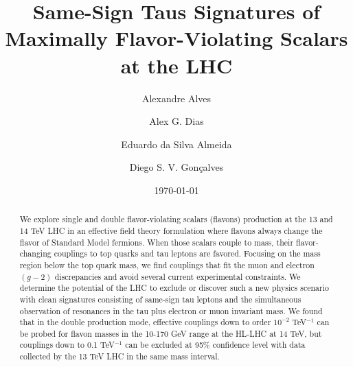 \documentclass[prd,amsfonts,onecolumn,superscriptaddress,aps,nofootinbib,11pt]{revtex4-1}
\begin{document}
	
\title{ %
Same-Sign Taus Signatures of Maximally Flavor-Violating Scalars at the LHC }

\author{Alexandre Alves}
\author{Alex G. Dias}
\author{Eduardo da Silva Almeida}
\author{Diego S. V. Gon\c{c}alves}

\date{\today}
	
\begin{abstract}
We explore single and double flavor-violating scalars (flavons) production at the 13 and 14 TeV LHC in an effective field theory formulation where flavons always change the flavor of Standard Model fermions. When those scalars couple to mass, their flavor-changing couplings to top quarks and tau leptons are favored. Focusing on the mass region below the top quark mass, we find couplings that fit the muon and electron $(g-2)$ discrepancies and avoid several current experimental constraints. We determine the potential of the LHC to exclude or discover such a new physics scenario with clean signatures consisting of same-sign tau leptons and the simultaneous observation of resonances in the tau plus electron or muon invariant mass. We found that in the double production mode, effective couplings down to order $10^{-2}$ TeV$^{-1}$ can be probed for flavon masses in the 10-170 GeV range at the HL-LHC at 14 TeV, but couplings down to 0.1 TeV$^{-1}$ can be excluded at 95\% confidence level with data collected by the 13 TeV LHC in the same mass interval. 
\end{abstract}

\maketitle
	
\end{document}
